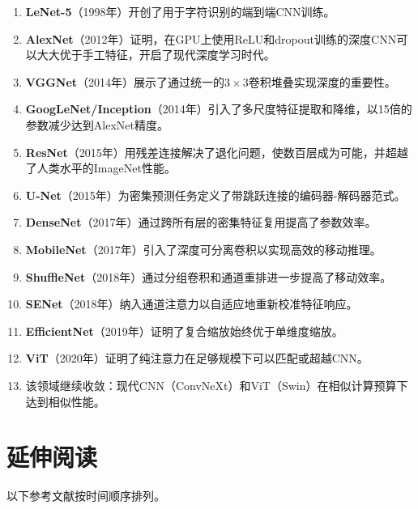 \begin{enumerate}
    \item \textbf{LeNet-5}（1998年）开创了用于字符识别的端到端CNN训练。
    \item \textbf{AlexNet}（2012年）证明，在GPU上使用ReLU和dropout训练的深度CNN可以大大优于手工特征，开启了现代深度学习时代。
    \item \textbf{VGGNet}（2014年）展示了通过统一的$3\times3$卷积堆叠实现深度的重要性。
    \item \textbf{GoogLeNet/Inception}（2014年）引入了多尺度特征提取和降维，以15倍的参数减少达到AlexNet精度。
    \item \textbf{ResNet}（2015年）用残差连接解决了退化问题，使数百层成为可能，并超越了人类水平的ImageNet性能。
    \item \textbf{U-Net}（2015年）为密集预测任务定义了带跳跃连接的编码器-解码器范式。
    \item \textbf{DenseNet}（2017年）通过跨所有层的密集特征复用提高了参数效率。
    \item \textbf{MobileNet}（2017年）引入了深度可分离卷积以实现高效的移动推理。
    \item \textbf{ShuffleNet}（2018年）通过分组卷积和通道重排进一步提高了移动效率。
    \item \textbf{SENet}（2018年）纳入通道注意力以自适应地重新校准特征响应。
    \item \textbf{EfficientNet}（2019年）证明了复合缩放始终优于单维度缩放。
    \item \textbf{ViT}（2020年）证明了纯注意力在足够规模下可以匹配或超越CNN。
    \item 该领域继续收敛：现代CNN（ConvNeXt）和ViT（Swin）在相似计算预算下达到相似性能。
\end{enumerate}

\section{延伸阅读}

以下参考文献按时间顺序排列。

